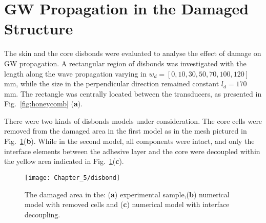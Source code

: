 \section{GW Propagation in the Damaged Structure}
\label{sec:disbond}
The skin and the core disbonds were evaluated to analyse the effect of damage on GW propagation.
A rectangular region of disbonds was investigated with the length along the wave propagation varying in \(w_d=[0,10,30,50,70,100,120]\) mm, while the size in the perpendicular direction remained constant \(l_d=170\) mm.
The rectangle was centrally located between the transducers, as presented in Fig.~\ref{fig:honeycomb} (\textbf{a}).

There were two kinds of disbonds models under consideration.
The core cells were removed from the damaged area in the first model as in the mesh pictured in Fig.~\ref{fig:disbond}(\textbf{b}).
While in the second model, all components were intact, and only the interface elements between the adhesive layer and the core were decoupled within the yellow area indicated in Fig.~\ref{fig:disbond}(\textbf{c}).
\begin{figure}
	\begin{center}
		\texttt{[image: Chapter\_5/disbond]}
	\end{center}
	\caption{The damaged area in the: (\textbf{a}) experimental sample,(\textbf{b}) numerical model with removed cells and (\textbf{c}) numerical model with interface decoupling.}
	\label{fig:disbond}
\end{figure}
